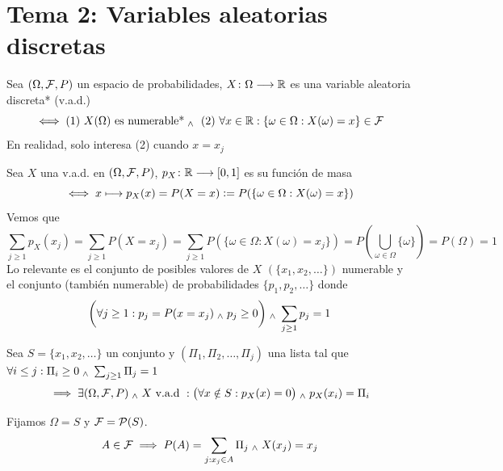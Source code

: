 \section{Tema 2: Variables aleatorias discretas}
\begin{defn}
	Sea $(\Omega, \mathcal{F}, P)$ un espacio de probabilidades, $X \colon \Omega \longrightarrow \mathbb{R}$ es una variable aleatoria discreta* (v.a.d.)
	\[\iff \text{(1) } X(\Omega) \text{ es numerable*} \; _{\wedge} \; \text{ (2) }\forall x \in \mathbb{R} : \{\omega \in \Omega : X(\omega)=x\} \in \mathcal{F}\]
	En realidad, solo interesa (2) cuando $x=x_j$
\end{defn}
\begin{defn}
	Sea $X$ una v.a.d. en $(\Omega, \mathcal{F}, P)$, $p_X \colon \mathbb{R} \longrightarrow \left[0,1\right]$ es su función de masa
	\[\iff x\longmapsto p_X(x)=P(X=x)\vcentcolon= P(\{\omega \in \Omega : X(\omega)=x\})\]
	Vemos que
	\[\sum_{j\geq1}p_X(x_j)=\sum_{j\geq1}P(X=x_j)=\sum_{j\geq1} P(\{\omega \in \Omega : X(\omega)=x_j\})=P\left(\bigcup_{\omega\in\Omega}\{\omega\}\right)=P(\Omega)=1\]
	Lo relevante es el conjunto de posibles valores de $X$ $(\{x_1, x_2, \dots\})$
	numerable y el conjunto (también numerable) de probabilidades $\{p_1, p_2,
		\dots\}$ donde
	\[\bigg(\forall j \geq 1 : p_j=P(x=x_j) \; _{\wedge} \; p_j\geq 0 \bigg) \; _{\wedge} \; \sum_{j\geq 1}p_j=1\]
\end{defn}

\begin{teo}
	Sea $S=\{x_1, x_2, \dots \}$ un conjunto y $(\Pi_1, \Pi_2, \dots, \Pi_j)$ una lista tal que \\
	$\forall i \leq j : \Pi_i \geq 0 \; _{\wedge} \; \sum_{j\geq 1}\Pi_j=1$
	\[\implies \exists (\Omega, \mathcal{F}, P) \; _{\wedge} \; X\text{ v.a.d }:\big(\forall  x\notin S :p_X(x)= 0 \big) \; _{\wedge} \; p_X(x_i)=\Pi_i\]
	\begin{dem}
		Fijamos $\Omega = S$ y $\mathcal{F}=\mathcal{P}(S)$.
		\[A\in \mathcal{F} \implies P(A)=\sum_{j:x_j\in A}\Pi_j \; _{\wedge} \; X(x_j)=x_j\]
	\end{dem}
\end{teo}

